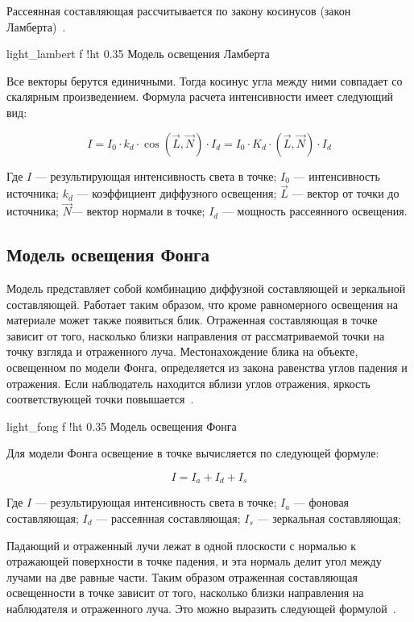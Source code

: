 Рассеянная составляющая рассчитывается по закону косинусов (закон Ламберта)~\cite{LIGHT}.

    {light_lambert}
    {f}
    {!ht}
    {0.35\textwidth}
    {Модель освещения Ламберта}

Все векторы берутся единичными. Тогда косинус угла между ними совпадает 
со скалярным произведением. Формула расчета интенсивности имеет следующий вид: 

\begin{equation}
    I = I_{0} \cdot k_{d} \cdot \cos(\vec{L}, \vec{N}) \cdot I_{d} = I_{0} \cdot K_{d} \cdot (\vec{L}, \vec{N}) \cdot I_{d}
\end{equation}

Где $I$ — результирующая интенсивность света в точке; 
$I_{0}$ — интенсивность источника; 
$k_{d}$ — коэффициент диффузного освещения;  
$\vec{L}$ — вектор от точки до источника; 
$\vec{N}$— вектор нормали в точке; 
$I_{d}$ — мощность рассеянного освещения.


\subsection{Модель освещения Фонга}
Модель представляет собой комбинацию диффузной составляющей и зеркальной составляющей. 
Работает таким образом, что кроме равномерного освещения на материале может также появиться блик. 
Отраженная составляющая в точке зависит от того, насколько близки направления от рассматриваемой 
точки на точку взгляда и отраженного луча. 
Местонахождение блика на объекте, освещенном по модели Фонга, определяется из закона равенства углов падения и отражения. 
Если наблюдатель находится вблизи углов отражения, яркость соответствующей точки повышается~\cite{LIGHT}.

    {light_fong}
    {f}
    {!ht}
    {0.35\textwidth}
    {Модель освещения Фонга}

Для модели Фонга освещение в точке вычисляется по следующей формуле:

\begin{equation}
    I = I_{a} + I_{d} + I_{s}
\end{equation}

Где $I$ — результирующая интенсивность света в точке; 
$I_{a}$ — фоновая составляющая; 
$I_{d}$ — рассеянная составляющая;
$I_{s}$ — зеркальная составляющая;


Падающий и отраженный лучи лежат в одной плоскости с нормалью к отражающей поверхности в точке падения, и эта нормаль делит угол между лучами на две равные части. 
Таким образом отраженная составляющая освещенности в точке зависит от того, насколько близки направления на наблюдателя и отраженного луча. 
Это можно выразить следующей формулой~\cite{LIGHT}.

